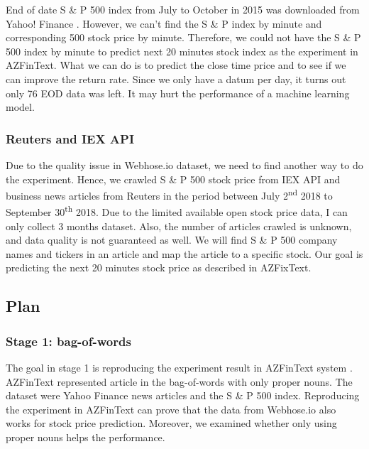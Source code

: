 \documentclass[sigconf]{acmart}
\newcommand{\ts}{\textsuperscript}
\begin{document}
End of date S \& P 500 index from July to October in 2015 was downloaded from Yahoo! Finance \cite{yf} . However, we can't find the S \& P index by minute and corresponding 500 stock price by minute.
Therefore, we could not have the S \& P 500 index by minute to predict next 20 minutes stock index as the experiment in AZFinText. What we can do is to predict the close time price and to see if we can improve
the return rate. Since we only have a datum per day, it turns out only 76 EOD data was left. It may hurt the performance of a machine learning model.

\subsubsection{Reuters and IEX API}
Due to the quality issue in Webhose.io dataset, we need to find another way to do the experiment. Hence, we crawled S \& P 500 stock price from IEX API \cite{IEX} and business news articles from 
Reuters \cite{reuters} in the period between July 2\ts{nd} 2018 to September 30\ts{th} 2018. Due to the limited available open stock price data, I can only collect 3 months dataset. Also, the number
of articles crawled is unknown, and data quality is not guaranteed as well. We will find S \& P 500 company names and tickers in an article and map the article to a specific stock. Our goal is predicting the
next 20 minutes stock price as described in AZFixText.

\subsection{Plan}
\subsubsection{Stage 1: bag-of-words}
	The goal in stage 1 is reproducing the experiment result in AZFinText system \cite{AZFinText}. AZFinText represented article in the bag-of-words with only proper nouns. The
	dataset were Yahoo Finance news articles and the S \& P 500 index. Reproducing the experiment in AZFinText can prove that the data from Webhose.io also works for stock
	price prediction. Moreover, we examined whether only using proper nouns helps the performance.
\end{document}
